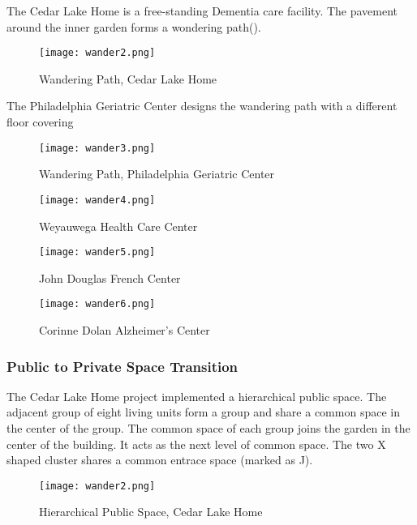 The Cedar Lake Home is a free-standing Dementia care facility. The
pavement around the inner garden forms a wondering
path().

\begin{figure}[htbp]
  \centering
  \texttt{[image: wander2.png]}
  \caption[Wandering Path, Cedar Lake Home]{Wandering Path, Cedar Lake Home~\cite{dementiaCase}}
  \label{fig:wander2}
\end{figure}

The Philadelphia Geriatric Center designs the wandering path with a
different floor covering
\begin{figure}[htbp]
  \centering
  \texttt{[image: wander3.png]}
  \caption[Wandering Path, Philadelphia Geriatric Center]{Wandering Path, Philadelphia Geriatric Center~\cite{dementiaCase}}
  \label{fig:wander3}
\end{figure}

\begin{figure}[htbp]
  \centering
  \texttt{[image: wander4.png]}
  \caption[Wandering Path, Weyauwega Health Care Center]{Weyauwega Health Care Center~\cite{dementiaCase}}
  \label{fig:wander4}
\end{figure}

\begin{figure}[htbp]
  \centering
  \texttt{[image: wander5.png]}
  \caption[John Douglas French Center for Alzheimer’s Disease]{John Douglas French Center~\cite{dementiaCase}}
  \label{fig:wander5}
\end{figure}

\begin{figure}[htbp]
  \centering
  \texttt{[image: wander6.png]}
  \caption[Corinne Dolan Alzheimer’s Center at Heather Hill]{Corinne Dolan Alzheimer’s Center~\cite{dementiaCase}}
  \label{fig:wander6}
\end{figure}

\subsubsection{Public to Private Space Transition}
The Cedar Lake Home project implemented a hierarchical public
space. The adjacent group of eight living units form a group and share
a common space in the center of the group. The common space of each
group joins the garden in the center of the building. It acts as the
next level of common space. The two X shaped cluster shares a common
entrace space (marked as J).
\begin{figure}[htbp]
  \centering
  \texttt{[image: wander2.png]}
  \caption[Hierarchical Public Space, Cedar Lake Home]{Hierarchical Public Space, Cedar Lake Home~\cite{dementiaCase}}
  \label{fig:wander2}
\end{figure}
